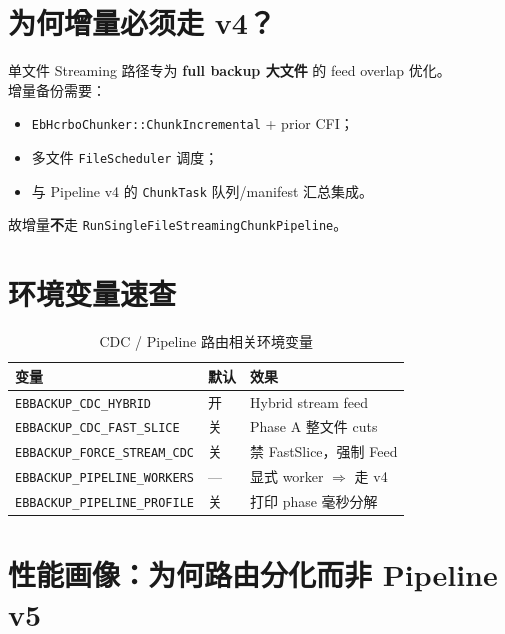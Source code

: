 \section{为何增量必须走 v4？}

\begin{corebox}[路由分化理由]
单文件 Streaming 路径专为 \textbf{full backup 大文件} 的 feed overlap 优化。\\
增量备份需要：
\begin{itemize}[nosep]
  \item \texttt{EbHcrboChunker::ChunkIncremental} + prior CFI；
  \item 多文件 \texttt{FileScheduler} 调度；
  \item 与 Pipeline v4 的 \texttt{ChunkTask} 队列/manifest 汇总集成。
\end{itemize}
故增量\textbf{不}走 \texttt{RunSingleFileStreamingChunkPipeline}。
\end{corebox}

\section{环境变量速查}

\begin{table}[htbp]
\centering
\caption{CDC / Pipeline 路由相关环境变量}
\label{tab:env}
\small
\begin{tabular}{@{}llp{6.5cm}@{}}
\toprule
变量 & 默认 & 效果 \\
\midrule
\texttt{EBBACKUP\_CDC\_HYBRID} & 开 & Hybrid stream feed \\
\texttt{EBBACKUP\_CDC\_FAST\_SLICE} & 关 & Phase A 整文件 cuts \\
\texttt{EBBACKUP\_FORCE\_STREAM\_CDC} & 关 & 禁 FastSlice，强制 Feed \\
\texttt{EBBACKUP\_PIPELINE\_WORKERS} & — & 显式 worker $\Rightarrow$ 走 v4 \\
\texttt{EBBACKUP\_PIPELINE\_PROFILE} & 关 & 打印 phase 毫秒分解 \\
\bottomrule
\end{tabular}
\end{table}

\section{性能画像：为何路由分化而非 Pipeline v5}

